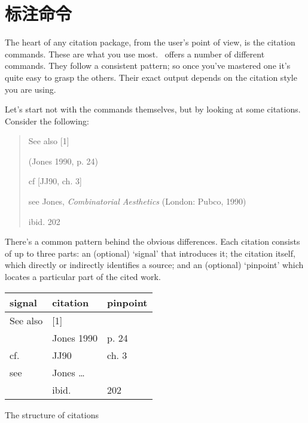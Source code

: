 \chapter{标注命令}\label{ch:citationcommands}

The heart of any citation package, from the user’s point of view, is
the citation commands. 
These are what you use most. \biblatex\ offers a
number of different commands. They follow a consistent pattern; so
once you've mastered one it’s quite easy to grasp the others. Their
exact output depends on the citation style you are using.

Let's start not with the commands themselves, but by looking at some
citations. Consider the following:

\begin{quote}
See also [1]

(Jones 1990, p. 24)

cf [JJ90, ch. 3]

see Jones, \emph{Combinatorial Aesthetics} (London: Pubco, 1990)

ibid. 202
\end{quote}

There's a common pattern behind the obvious differences. Each citation
consists of up to three parts: an (optional) `signal' that introduces
it; the citation itself, which directly or indirectly identifies a
source; and an (optional) `pinpoint' which locates a particular part
of the cited work.

\begin{margintable}
\begin{tabular}{lll}
\toprule
\textsf{signal} & \textsf{citation} & \textsf{pinpoint} \\
\midrule
See also &   [1] \\
         &   Jones 1990   & p. 24 \\
cf.      &   JJ90         & ch. 3 \\
see      &   Jones \ldots\    \\
         &   ibid.        &  202 \\
\bottomrule
\end{tabular}
\vspace{3pt}
\caption{The structure of citations}
\end{margintable}


